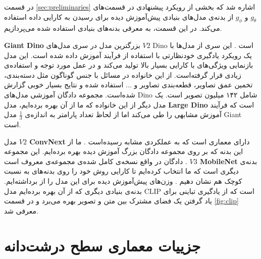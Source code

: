 در قسمت 
\ref{sec:preliminaries}
اشاره شد که بخشی از رویکرد پیشنهادی در قسمت‌های 
$g_\theta$
و 
$g_\phi$
از بدنه‌ی مدل‌های بنیادی پیش‌آموزش دیده برای رسیدن به کارایی داده استفاده می‌کند. در این قسمت، به معرفی بدنه‌های بنیادی استفاده شده می‌پردازیم.

\textbf{Giant Dino}
بزرگترین مدل در سری مدل‌های 
$V2$ Dino
است
\cite{dinov2}
.
این سری از مدل‌ها با یک رویکرد یادگیری خودنظارتی با استفاده از فرآیند
آموزش داده شده است. این مدل بازنمایی ویژگی‌های با کارایی بسیار بالا تولید می‌کند و در عمل مورد توجه و استفاده‌ی زیادی قرار گرفته‌است. از این خانواده در مسائل با جنس گوناگون مثل دسته‌بندی، تخمین عمق تصاویر، قطعه‌بندی تصاویر و ... استفاده شده و نتایج بسیار خوبی گزارش شده‌است. مجموعه دادگان آموزشی مدل‌های Dino
شامل ۱۴۲ میلیون تصویر است. یک مدل دیگر از این خانواده که ما از آن بهره برده‌ایم، مدل 
\textbf{Large Dino}
است که فرآیند آموزش مشابهی را طی می‌کند اما از لحاظ تعداد پارامتر به اندازه‌ی 
$\frac{1}{3}$
مدل Giant است.

مدل 
\textbf{$V2$ ConvNext}
دارای معماری 
است که به عملکردی مشابه 
رسیده‌است
\cite{Liu2022ACF}
.
ما از این بدنه که بر روی مجموعه دادگان بزرگ 
آموزش دیده بهره برده‌ایم. این مجموعه دادگان در واقع نسخه‌ی کامل شده‌ی مجموعه‌ی معروف 
است
\cite{Russakovsky2014ImageNetLS}
.
\textbf{$V3$ MobileNet}
بدنه‌ی دیگری است که ما انتخاب کرده‌ایم تا کارایی روش خود را روی بدنه‌های به نسبت کوچک هم نشان دهیم
\cite{Howard2019SearchingFM}
. 
وزن‌های پیش‌آموزش دیده برای این مدل را از 
\cite{Ridnik2021ImageNet21KPF}
برداشته‌ایم. بدنه‌ی بنیادی دیگری که از آن بهره برده‌ایم مدل CLIP است که از یادگیری تباینی برای یاد گرفتن یک فضای مشترک بین متن و تصویر بهره می‌برد و در قسمت
\ref{fig:clip}
معرفی شد.

\section{جزییات معماری سطح درشت‌دانه}

